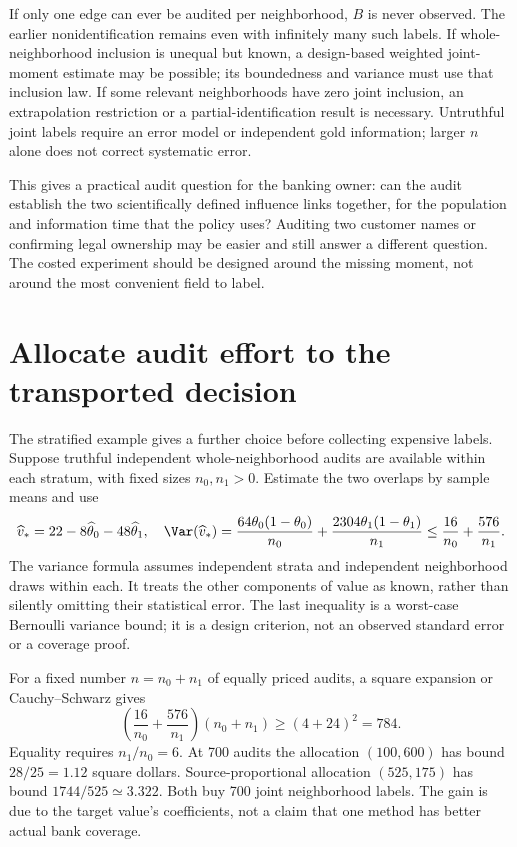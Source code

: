 If only one edge can ever be audited per neighborhood, $B$ is never observed.
The earlier nonidentification remains even with infinitely many such labels.
If whole-neighborhood inclusion is unequal but known, a design-based weighted
joint-moment estimate may be possible; its boundedness and variance must use
that inclusion law. If some relevant neighborhoods have zero joint inclusion,
an extrapolation restriction or a partial-identification result is necessary.
Untruthful joint labels require an error model or independent gold information;
larger $n$ alone does not correct systematic error.

This gives a practical audit question for the banking owner: can the audit
establish the two scientifically defined influence links together, for the
population and information time that the policy uses? Auditing two customer
names or confirming legal ownership may be easier and still answer a different
question. The costed experiment should be designed around the missing moment,
not around the most convenient field to label.

\section{Allocate audit effort to the transported decision}
\label{exec17:s7-allocation}

The stratified example gives a further choice before collecting expensive
labels. Suppose truthful independent whole-neighborhood audits are available
within each stratum, with fixed sizes $n_0,n_1>0$. Estimate the two overlaps
by sample means and use
\begin{equation}
 \widehat v_*=22-8\widehat\theta_0-48\widehat\theta_1,
 \quad
 \Var(\widehat v_*)=
 \frac{64\theta_0(1-\theta_0)}{n_0}
 +\frac{2304\theta_1(1-\theta_1)}{n_1}
 \leq\frac{16}{n_0}+\frac{576}{n_1}.
 \label{exec17:s7-audit-variance}
\end{equation}
The variance formula assumes independent strata and independent neighborhood
draws within each. It treats the other components of value as known, rather
than silently omitting their statistical error. The last inequality is a
worst-case Bernoulli variance bound; it is a design criterion, not an observed
standard error or a coverage proof.

For a fixed number $n=n_0+n_1$ of equally priced audits, a square expansion or
Cauchy--Schwarz gives
\begin{equation}
 \left(\frac{16}{n_0}+\frac{576}{n_1}\right)(n_0+n_1)
 \geq(4+24)^2=784.
 \label{exec17:s7-audit-optimum}
\end{equation}
Equality requires $n_1/n_0=6$. At 700 audits the allocation $(100,600)$ has
bound $28/25=1.12$ square dollars. Source-proportional allocation $(525,175)$
has bound $1744/525\simeq3.322$. Both buy 700 joint neighborhood labels. The
gain is due to the target value's coefficients, not a claim that one method
has better actual bank coverage.~\citep{exec17_s7_math}

